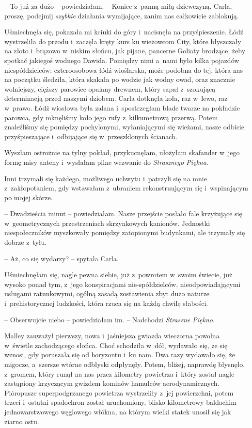 \documentclass[oneside,polish,11pt,sfheadings]{mwbk}
\begin{document}
-- To już za dużo -- powiedziałam. -- Koniec z~panną miłą dziewczyną.
Carla, proszę, podejmij \textit{szybkie} działania wymijające, zanim nas
całkowicie zablokują.

Uśmiechnęła się, pokazała mi kciuki do góry i~nacisnęła na
przyśpieszenie. Łódź wystrzeliła do przodu i~zaczęła kręty kurs ku
wieżowcom City, które błyszczały na złoto i~brązowo w~niskim słońcu, jak
pijane, pancerne Goliaty brodzące, żeby spotkać jakiegoś wodnego Dawida.
Pomiędzy nimi a~nami było kilka pojazdów niespółdzielców: czteroosobowa
łódź wioślarska, może podobna do tej, która nas na początku śledziła,
która skakała po wodzie jak wodny owad, oraz znacznie wolniejszy,
cięższy parowiec opalany drewnem, który sapał z~szokującą determinacją
przed naszymi dziobem. Carla dotknęła koła, raz w~lewo, raz w~prawo.
Łódź wiosłowa była zalana i~spostrzegłam blade twarze na pokładzie
parowca, gdy mknęliśmy koło jego rufy z~kilkumetrową przerwą. Potem
znaleźliśmy się pomiędzy pochylonymi, wyłaniającymi się wieżami, nasze
odbicie przyśpieszające i~odbijające się w~przeszklonych ścianach.

Wyszłam ostrożnie na tylny pokład, przykucnęłam, ułożyłam skafander w~jego formę misy anteny i~wysłałam pilne wezwanie do \textit{Strasznego
Piękna}.

Inni trzymali się każdego, możliwego uchwytu i~patrzyli się na mnie z~zakłopotaniem, gdy wstawałam z~ubraniem rekonstruującym się i~wspinającym po mojej skórze.

-- Dwadzieścia minut -- powiedziałam. Nasze przejście posłało fale
krzyżujące się w~geometrycznych przestrzeniach skrzynkowych kanionów.
Jednostki niespołeczników myszkowały pomiędzy zatopionymi budynkami, ale
trzymały się dobrze z~tyłu.

-- Aż, co się wydarzy? -- spytała Carla.

Uśmiechnęłam się, nagle pewna siebie, już z~powrotem w~swoim świecie,
już wysoko ponad tym, z~jego konspiracjami nie-spółdzielców,
nieodpowiadającymi usługami ratunkowymi, ogólną zasadą zostawienia zbyt
dużo naturze i~prehistorycznej ludzkości, która rzuca się na każdą
chwilę słabości.

-- Obserwujcie niebo -- powiedziałam im. -- Nadchodzi \textit{Straszne
Piękno}.

Malley zauważył pierwszy, nowa i~jaśniejsza gwiazda wieczorna powolna w~świetle zachodzącego słońca. Choć schodziła w~dół, wydawało się, że się
wznosi, gdy poruszała się od horyzontu i~ku nam. Dwa razy wydawało się,
że migocze, a~szersze wtórne odbłyski odpłynęły. Potem, bliżej, naprawdę
błysnęło, z~gromem, który runął na nas przez kilometry powietrza i~który
został nagle zastąpiony krzyczącym gwizdem kominów hamulców
aerodynamicznych. Pióropusze superpodgrzanego powietrza wystrzeliły z~jej powierzchni, potem trzeci i~ostatni spadochron został uruchomiony,
blisko kilometrowy baldachim jednowarstwowego węglowego włókna, na
którym wielki statek unosił się jak ziarno ostu.
\end{document}
